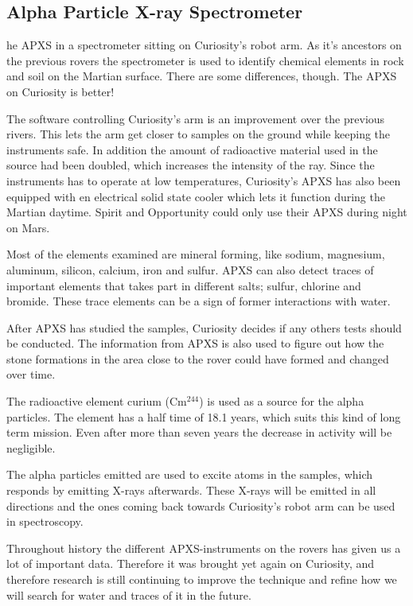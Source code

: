 \subsection{Alpha Particle X-ray Spectrometer}
he APXS in a spectrometer sitting on Curiosity's robot arm.
As it's ancestors on the previous rovers the spectrometer is used to identify chemical elements in rock and soil on the Martian surface.
There are some differences, though.
The APXS on Curiosity is better!

The software controlling Curiosity's arm is an improvement over the previous rivers.
This lets the arm get closer to samples on the ground while keeping the instruments safe.
In addition the amount of radioactive material used in the source had been doubled, which increases the intensity of the ray.
Since the instruments has to operate at low temperatures, Curiosity's APXS has also been equipped with en electrical solid state cooler which lets it function during the Martian daytime.
Spirit and Opportunity could only use their APXS during night on Mars.

Most of the elements examined are mineral forming, like sodium, magnesium, aluminum, silicon, calcium, iron and sulfur.
APXS can also detect traces of important elements that takes part in different salts; sulfur, chlorine and bromide.
These trace elements can be a sign of former interactions with water.

After APXS has studied the samples, Curiosity decides if any others tests should be conducted.
The information from APXS is also used to figure out how the stone formations in the area close to the rover could have formed and changed over time.

The radioactive element curium (Cm$^{244}$) is used as a source for the alpha particles.
The element has a half time of 18.1 years, which suits this kind of long term mission.
Even after more than seven years the decrease in activity will be negligible.

The alpha particles emitted are used to excite atoms in the samples, which responds by emitting X-rays afterwards.
These X-rays will be emitted in all directions and the ones coming back towards Curiosity's robot arm can be used in spectroscopy.

Throughout history the different APXS-instruments on the rovers has given us a lot of important data.
Therefore it was brought yet again on Curiosity, and therefore research is still continuing to improve the technique and refine how we will search for water and traces of it in the future.